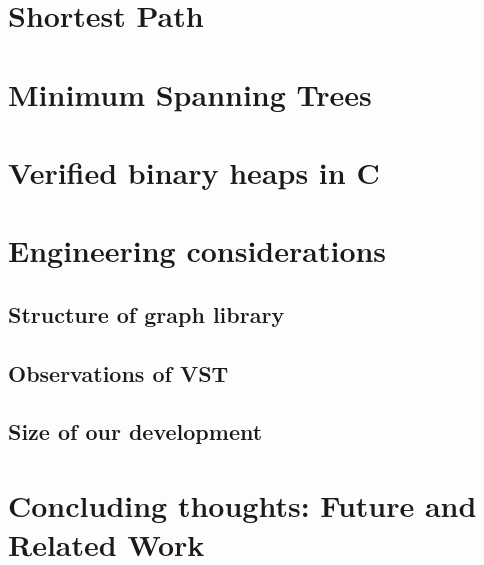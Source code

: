 \documentclass[runningheads]{llncs}
\newcommand\hide[1]{}
\begin{document}
	\section{Shortest Path}
	\label{sec:dijkstra}
	
	
    \section{Minimum Spanning Trees}
    \label{sec:mst}
    
	
	
	

    \section{Verified binary heaps in C}
    \label{sec:binheap}
    

	
    \section{Engineering considerations}
    \label{sec:stats}

	\subsection{Structure of graph library}
	\label{sec:structure}
	

	\subsection{Observations of VST}
	\label{sec:vst}
	

    \subsection{Size of our development}

	\section{Concluding thoughts: Future and Related Work}
	\label{sec:conclusion}

	
	
	
	\appendix
	\label{sec:apx}
	
	
\end{document}
